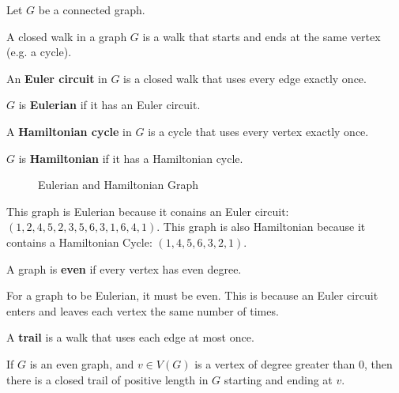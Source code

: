 Let \( G \) be a connected graph.
\begin{definition}
	A closed walk in a graph \( G \) is a walk that starts and ends at the same vertex (e.g. a cycle).
\end{definition}

\begin{definition}
	An \textbf{Euler circuit} in \( G \) is a closed walk that uses every edge exactly once.
\end{definition}

\begin{definition}
	\( G \) is \textbf{Eulerian} if it has an Euler circuit.
\end{definition}

\begin{definition}
	A \textbf{Hamiltonian cycle} in \( G \) is a cycle that uses every vertex exactly once.
\end{definition}

\begin{definition}
	\( G \) is \textbf{Hamiltonian} if it has a Hamiltonian cycle.
\end{definition}

\begin{figure}[ht]
    \centering
    \caption{Eulerian and Hamiltonian Graph}
    \label{fig:example-graphs}
\end{figure}

This graph is Eulerian because it conains an Euler circuit: \( (1, 2, 4, 5, 2, 3, 5, 6, 3, 1, 6, 4, 1) \). This graph is also Hamiltonian because it contains a Hamiltonian Cycle: \( (1, 4, 5, 6, 3, 2, 1) \).

\begin{definition}
	A graph is \textbf{even} if every vertex has even degree.
\end{definition}

\begin{observe}
	For a graph to be Eulerian, it must be even. This is because an Euler circuit enters and leaves each vertex the same number of times.
\end{observe}

\begin{definition}
	A \textbf{trail} is a walk that uses each edge at most once.
\end{definition}

\begin{lemma}
	If \( G \) is an even graph, and \( v \in  V(G) \) is a vertex of degree greater than 0, then there is a closed trail of positive length in \( G \) starting and ending at \( v \).
\end{lemma}

